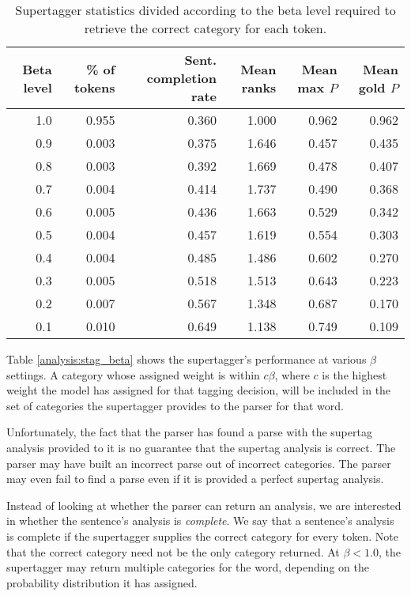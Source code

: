 \begin{table}
\centering
\begin{tabular}{r|r|r|r|r|r}
Beta level & \% of tokens & Sent. completion rate & Mean ranks & Mean max $P$ & Mean gold $P$\\
\hline
1.0 & 0.955 & 0.360 & 1.000 & 0.962 & 0.962\\
0.9 & 0.003 & 0.375 & 1.646 & 0.457 & 0.435\\
0.8 & 0.003 & 0.392 & 1.669 & 0.478 & 0.407\\
0.7 & 0.004 & 0.414 & 1.737 & 0.490 & 0.368\\
0.6 & 0.005 & 0.436 & 1.663 & 0.529 & 0.342\\
0.5 & 0.004 & 0.457 & 1.619 & 0.554 & 0.303\\
0.4 & 0.004 & 0.485 & 1.486 & 0.602 & 0.270\\
0.3 & 0.005 & 0.518 & 1.513 & 0.643 & 0.223\\
0.2 & 0.007 & 0.567 & 1.348 & 0.687 & 0.170\\
0.1 & 0.010 & 0.649 & 1.138 & 0.749 & 0.109\\
\end{tabular}\caption{Supertagger statistics divided according to the beta level required to retrieve the correct category for each token.}
\end{table}


Table \ref{analysis:stag_beta} shows the supertagger's performance at various $\beta$ settings. A category whose assigned weight is within $c\beta$, where $c$ is the highest weight the model has assigned for that tagging decision, will be included in the set of categories the supertagger provides to the parser for that word.

Unfortunately, the fact that the parser has found a parse with the supertag analysis provided to it is no guarantee that the supertag analysis is correct. The parser may have built an incorrect parse out of incorrect categories. The parser may even fail to find a parse even if it is provided a perfect supertag analysis.

Instead of looking at whether the parser can return an analysis, we are interested in whether the sentence's analysis is \emph{complete}. We say that a sentence's analysis is complete if the supertagger supplies the correct category for every token. Note that the correct category need not be the only category returned. At $\beta < 1.0$, the supertagger may return multiple categories for the word, depending on the probability distribution it has assigned.

